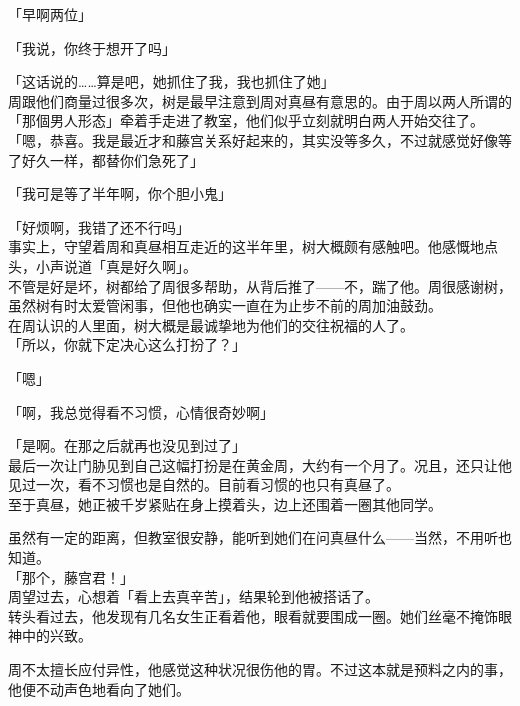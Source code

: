 「早啊两位」

「我说，你终于想开了吗」

「这话说的……算是吧，她抓住了我，我也抓住了她」\\

周跟他们商量过很多次，树是最早注意到周对真昼有意思的。由于周以两人所谓的「那個男人形态」牵着手走进了教室，他们似乎立刻就明白两人开始交往了。\\

「嗯，恭喜。我是最近才和藤宫关系好起来的，其实没等多久，不过就感觉好像等了好久一样，都替你们急死了」

「我可是等了半年啊，你个胆小鬼」

「好烦啊，我错了还不行吗」\\

事实上，守望着周和真昼相互走近的这半年里，树大概颇有感触吧。他感慨地点头，小声说道「真是好久啊」。\\

不管是好是坏，树都给了周很多帮助，从背后推了——不，踹了他。周很感谢树，虽然树有时太爱管闲事，但他也确实一直在为止步不前的周加油鼓劲。\\

在周认识的人里面，树大概是最诚挚地为他们的交往祝福的人了。\\

「所以，你就下定决心这么打扮了？」

「嗯」

「啊，我总觉得看不习惯，心情很奇妙啊」

「是啊。在那之后就再也没见到过了」\\

最后一次让门胁见到自己这幅打扮是在黄金周，大约有一个月了。况且，还只让他见过一次，看不习惯也是自然的。目前看习惯的也只有真昼了。\\

至于真昼，她正被千岁紧贴在身上摸着头，边上还围着一圈其他同学。

虽然有一定的距离，但教室很安静，能听到她们在问真昼什么——当然，不用听也知道。\\

「那个，藤宫君！」\\

周望过去，心想着「看上去真辛苦」，结果轮到他被搭话了。\\

转头看过去，他发现有几名女生正看着他，眼看就要围成一圈。她们丝毫不掩饰眼神中的兴致。

周不太擅长应付异性，他感觉这种状况很伤他的胃。不过这本就是预料之内的事，他便不动声色地看向了她们。\\

